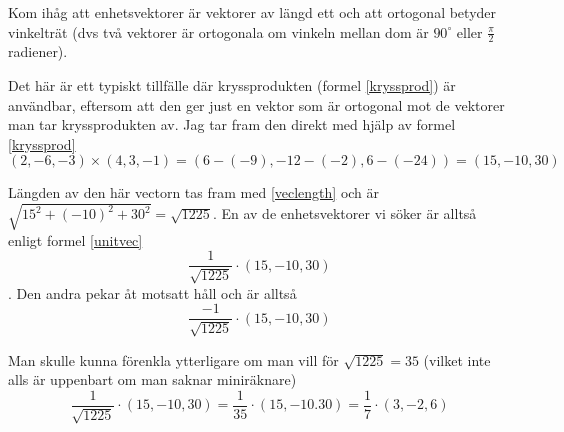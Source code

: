 \documentclass[../../main.tex]{subfiles}
\begin{document}
\begin{solution}{5}
Kom ihåg att enhetsvektorer är vektorer av längd ett och att ortogonal betyder vinkelträt (dvs två vektorer är ortogonala om vinkeln mellan dom är $90^\circ$ eller $\frac{\pi}{2}$ radiener).

Det här är ett typiskt tillfälle där kryssprodukten (formel \ref{kryssprod}) är användbar, eftersom att den ger just en vektor som är ortogonal mot de vektorer man tar kryssprodukten av. Jag tar fram den direkt med hjälp av formel \ref{kryssprod}
\[(2, -6, -3)\times (4, 3, -1) = (6 - (-9), -12 - (-2), 6 - (-24)) = (15, -10, 30)\]

Längden av den här vectorn tas fram med \ref{veclength} och är \(\sqrt{15^2 + (-10)^2 + 30^2} = \sqrt{1225}\). En av de enhetsvektorer vi söker är alltså enligt formel \ref{unitvec} 
\[\frac{1}{\sqrt{1225}}\cdot(15, -10, 30)\].
Den andra pekar åt motsatt håll och är alltså 
\[\frac{-1}{\sqrt{1225}}\cdot(15, -10, 30)\]

Man skulle kunna förenkla ytterligare om man vill för $\sqrt{1225} = 35$ (vilket inte alls är uppenbart om man saknar miniräknare)
\[\frac{1}{\sqrt{1225}}\cdot(15, -10, 30) = \frac{1}{35}\cdot(15, -10. 30) = \frac{1}{7}\cdot(3, -2, 6)\]
\end{solution}
\end{document}
